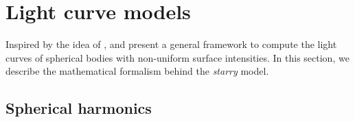 \documentclass[modern]{aastex631}
\begin{document}


\section{Light curve models}\label{starry}

Inspired by the idea of \cite{pal2012}, \cite{starry} and \cite{Agol2020} present a general framework to compute the light curves of spherical bodies with non-uniform surface intensities. In this section, we describe the mathematical formalism behind the \textit{starry} model.

\subsection{Spherical harmonics}
\end{document}
